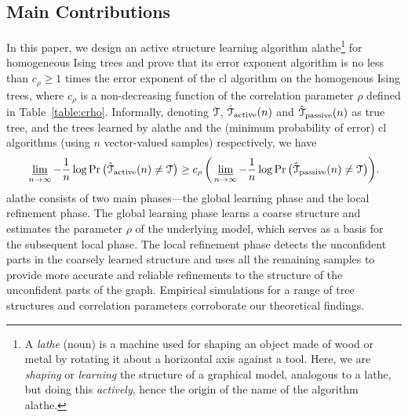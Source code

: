 \renewcommand{\thefootnote}{\arabic{footnote}}
\subsection{Main Contributions}
In this paper, we design an active structure learning algorithm \ac{alathe}\footnote{A \emph{lathe} (noun) is a machine used for shaping an object made of wood or metal by   rotating it about a horizontal axis against a tool. Here,  we are  {\em shaping} or {\em learning}  the structure of a graphical model, analogous to  a lathe, but doing this {\em actively}, hence the origin of the name of the algorithm \ac{alathe}.} for homogeneous Ising trees and prove that its error exponent   algorithm is no less than $c_{\rho}\geq 1$ times the error exponent of the \ac{cl} algorithm on the homogenous Ising trees, where $c_{\rho}$ is a non-decreasing function of the correlation parameter $\rho$ defined in Table~\ref{table:crho}. Informally, denoting $\mathcal{T}$, $\hat{\mathcal{T}}_{{\rm active}}(n)$ and $\hat{\mathcal{T}}_{{\rm passive}}(n)$ as true tree, and  the trees learned by \ac{alathe} and the (minimum probability of error) \ac{cl} algorithms (using $n$ vector-valued samples) respectively,  we have
\begin{equation}
    \varliminf_{n\rightarrow \infty}-\frac{1}{n}\log \Pr \big(\hat{\mathcal{T}}_{{\rm active}}(n)\neq \mathcal{T}\big)\ge c_\rho\,\bigg( \varliminf_{n\rightarrow \infty}-\frac{1}{n}\log \Pr \big(\hat{\mathcal{T}}_{{\rm passive}}(n)\neq \mathcal{T}\big)\bigg).
\end{equation}
\ac{alathe} consists of two main phases---the global learning phase and the local refinement phase. The global learning phase learns a coarse structure and estimates the parameter $\rho$ of the underlying model, which serves as a basis for the 
subsequent local phase. The local refinement phase detects the unconfident parts in the coarsely learned structure and uses all the remaining samples to provide more accurate and reliable refinements to the structure of the unconfident parts of the graph.  Empirical simulations for a range of tree structures and correlation parameters corroborate our theoretical findings. 

